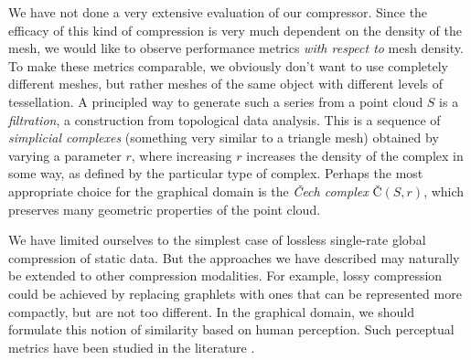 \documentclass{egpubl}
\begin{document}
We have not done a very extensive evaluation of our compressor. Since the efficacy of this kind of compression is very much dependent on the density of the mesh, we would like to observe performance metrics \textit{with respect to} mesh density. To make these metrics comparable, we obviously don't want to use completely different meshes, but rather meshes of the same object with different levels of tessellation. 
A principled way to generate such a series from a point cloud $S$ is a \textit{filtration}, a construction from topological data analysis.
This is a sequence of \textit{simplicial complexes} (something very similar to a triangle mesh) obtained by varying a parameter $r$, where increasing $r$ increases the density of the complex in some way, as defined by the particular type of complex. Perhaps the most appropriate choice for the graphical domain is the \textit{Čech complex} Č$(S,r)$, which preserves many geometric properties of the point cloud.

We have limited ourselves to the simplest case of lossless single-rate global compression of static data. But the approaches we have described may naturally be extended to other compression modalities. For example, lossy compression could be achieved by replacing graphlets with ones that can be represented more compactly, but are not too different. In the graphical domain, we should formulate this notion of similarity based on human perception. Such perceptual metrics have been studied in the literature \cite{corsini2013perceptual}.



%



\end{document}

